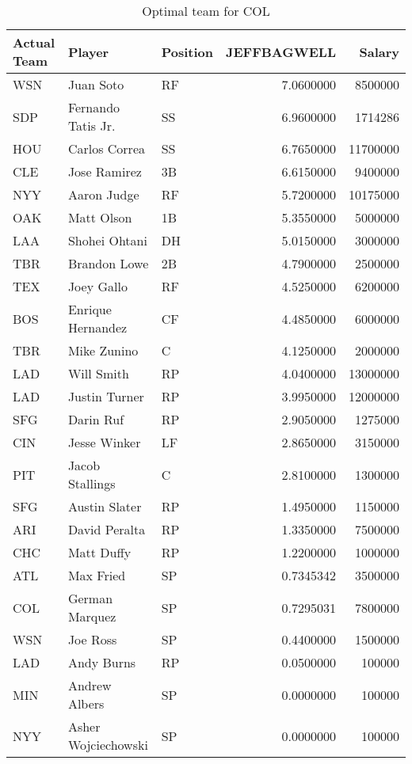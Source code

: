 \begin{table}

\caption{Optimal team for COL}
\centering
\begin{tabular}[t]{l|l|l|r|r}
\hline
Actual Team & Player & Position & JEFFBAGWELL & Salary\\
\hline
WSN & Juan Soto & RF & 7.0600000 & 8500000\\
\hline
SDP & Fernando Tatis Jr. & SS & 6.9600000 & 1714286\\
\hline
HOU & Carlos Correa & SS & 6.7650000 & 11700000\\
\hline
CLE & Jose Ramirez & 3B & 6.6150000 & 9400000\\
\hline
NYY & Aaron Judge & RF & 5.7200000 & 10175000\\
\hline
OAK & Matt Olson & 1B & 5.3550000 & 5000000\\
\hline
LAA & Shohei Ohtani & DH & 5.0150000 & 3000000\\
\hline
TBR & Brandon Lowe & 2B & 4.7900000 & 2500000\\
\hline
TEX & Joey Gallo & RF & 4.5250000 & 6200000\\
\hline
BOS & Enrique Hernandez & CF & 4.4850000 & 6000000\\
\hline
TBR & Mike Zunino & C & 4.1250000 & 2000000\\
\hline
LAD & Will Smith & RP & 4.0400000 & 13000000\\
\hline
LAD & Justin Turner & RP & 3.9950000 & 12000000\\
\hline
SFG & Darin Ruf & RP & 2.9050000 & 1275000\\
\hline
CIN & Jesse Winker & LF & 2.8650000 & 3150000\\
\hline
PIT & Jacob Stallings & C & 2.8100000 & 1300000\\
\hline
SFG & Austin Slater & RP & 1.4950000 & 1150000\\
\hline
ARI & David Peralta & RP & 1.3350000 & 7500000\\
\hline
CHC & Matt Duffy & RP & 1.2200000 & 1000000\\
\hline
ATL & Max Fried & SP & 0.7345342 & 3500000\\
\hline
COL & German Marquez & SP & 0.7295031 & 7800000\\
\hline
WSN & Joe Ross & SP & 0.4400000 & 1500000\\
\hline
LAD & Andy Burns & RP & 0.0500000 & 100000\\
\hline
MIN & Andrew Albers & SP & 0.0000000 & 100000\\
\hline
NYY & Asher Wojciechowski & SP & 0.0000000 & 100000\\
\hline
\end{tabular}
\end{table}
